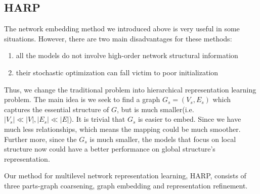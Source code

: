 \documentclass[conference]{IEEEtran}
\begin{document}
\subsection*{HARP}
The network embedding method we introduced above is very useful in some situations.
 However, there are two main disadvantages for these methods:
\begin{enumerate}
	\item all the models do not involve high-order network structural information
	\item their stochastic optimization can fall victim to poor initialization
\end{enumerate}
Thus, we change the traditional problem into hierarchical representation learning problem. The main idea is we seek to find a graph $G_s=(V_s,E_s)$ which captures the essential structure of $G$, but is much smaller(i.e. $|V_s|\ll|V|,|E_s|\ll|E|$). It is trivial that $G_s$ is easier to embed. Since we have much less relationships, which means the mapping could be much smoother. Further more, since the $G_s$ is much smaller, the models that focus on local structure now could have a better performance on global structure's representation.

Our method for multilevel network representation learning, HARP\cite{chen2017harp}, consists of three parts-graph coarsening, graph embedding and representation refinement.
\end{document}
